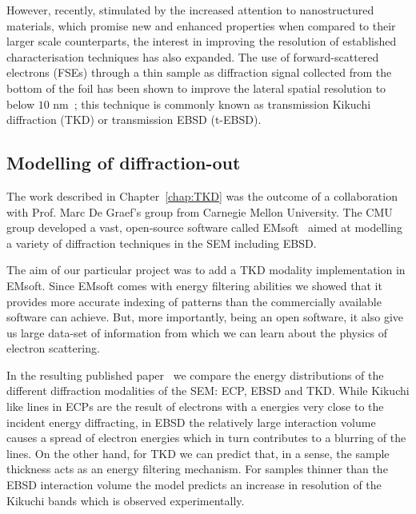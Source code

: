 However, recently, stimulated by the increased attention to nanostructured materials, which promise new and enhanced properties when compared to their larger scale counterparts, the interest in improving the resolution of established characterisation techniques has also expanded. The use of forward-scattered electrons (FSEs) through a thin sample as diffraction signal collected from the bottom of the foil has been shown to improve the lateral spatial resolution to below $10$ nm~\cite{Keller12, Trimby12}; this technique is commonly known as transmission Kikuchi diffraction (TKD) or transmission EBSD (t-EBSD). 

\subsection{Modelling of diffraction-out}

The work described in Chapter~\ref{chap:TKD} was the outcome of a collaboration with Prof. Marc De Graef's group from Carnegie Mellon University. The CMU group developed a vast, open-source software called EMsoft~\cite{EMsoft} aimed at modelling a variety of diffraction techniques in the SEM including EBSD. 

The aim of our particular project was to add a TKD modality implementation in EMsoft. Since EMsoft comes with energy filtering abilities we showed that it provides more accurate indexing of patterns than the commercially available software can achieve. But, more importantly, being an open software, it also give us large data-set of information from which we can learn about the physics of electron scattering.  

In the resulting published paper~\cite{PascalTKD}  we compare the energy distributions of the different diffraction modalities of the SEM: ECP, EBSD and TKD. While Kikuchi like lines in ECPs are the result of electrons with a energies very close to the incident energy diffracting, in EBSD the relatively large interaction volume causes a spread of electron energies which in turn contributes to a blurring of the lines. On the other hand, for TKD we can predict that, in a sense, the sample thickness acts as an energy filtering mechanism. For samples thinner than the EBSD interaction volume the model predicts an increase in resolution of the Kikuchi bands which is observed experimentally. 